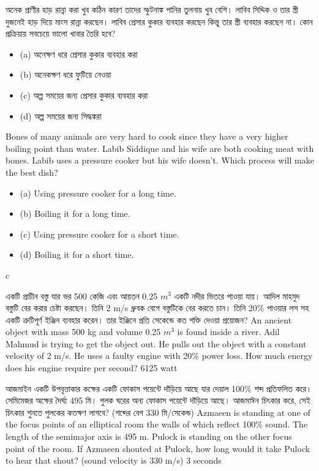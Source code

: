 \documentclass[article, 12pt, a4paper, onesize]{memoir}
\begin{document}
\begin{Problems}
    \problem
    {অনেক প্রাণীর হাড় রান্না করা খুব কঠিন কারণ তাদের স্ফুটনাঙ্ক পানির তুলনায় খুব বেশি। লাবিব সিদ্দিক ও তার স্ত্রী দুজনেই হাড় দিয়ে মাংস রান্না করছেন। লাবিব প্রেসার কুকার ব্যবহার করছেন কিন্তু তার স্ত্রী ব্যবহার করছেন না। কোন প্রক্রিয়ায় সবচেয়ে ভালো খাবার তৈরি হবে?
    \begin{itemize}
        \item[] (a) অনেক্ষণ ধরে প্রেসার কুকার ব্যবহার করা
        \item[] (b) অনেকক্ষণ ধরে ফুটিয়ে নেওয়া
        \item[] (c) অল্প সময়ের জন্য প্রেসার কুকার ব্যবহার করা
        \item[] (d) অল্প সময়ের জন্য সিদ্ধঙ্করা
    \end{itemize}
    }
    {Bones of many animals are very hard to cook since they have a very higher boiling point than water. Labib Siddique and his wife are both cooking meat with bones. Labib uses a pressure cooker but his wife doesn't. Which process will make the best dish?
    \begin{itemize}
        \item[] (a) Using pressure cooker for a long time.
        \item[] (b) Boiling it for a long time.
        \item[] (c) Using pressure cooker for a short time.
        \item[] (d) Boiling it for a short time.
    \end{itemize}
    }
    {}
    {c}

    \problem
    {একটি প্রাচীন বস্তু যার ভর 500 কেজি এবং আয়তন 0.25 $m^3$ একটি নদীর ভিতরে পাওয়া যায়। আদিল মাহমুদ বস্তুটি বের করার চেষ্টা করছেন। তিনি 2 m/s ধ্রুবক বেগে বস্তুটিকে বের করতে চান। তিনি 20\% পাওয়ার লস সহ একটি ত্রুটিপূর্ণ ইঞ্জিন ব্যবহার করেন। তার ইঞ্জিনে প্রতি সেকেন্ডে কত শক্তি দেওয়া প্রয়োজন?}
    {An ancient object with mass 500 kg and volume 0.25 $m^3$ is found inside a river. Adil Mahmud is trying to get the object out. He pulls out the object with a constant velocity of 2 m/s. He uses a faulty engine with 20\% power loss. How much energy does his engine require per second?}
    {}
    {6125 watt}


    \problem
    {আজমাইন একটি উপবৃত্তাকার কক্ষের একটি ফোকাস পয়েন্টে দাঁড়িয়ে আছে যার দেয়াল 100\% শব্দ প্রতিফলিত করে। সেমিমেজর অক্ষের দৈর্ঘ্য 495 মি। পুলক ঘরের অন্য ফোকাস পয়েন্টে দাঁড়িয়ে আছে। আজমাঈন চিৎকার করে, সেই চিৎকার শুনতে পুলকের কতক্ষণ লাগবে? (শব্দের বেগ 330 মি/সেকেন্ড)}
    {Azmaeen is standing at one of the focus points of an elliptical room the walls of which reflect 100\% sound. The length of the semimajor axis is 495 m. Pulock is standing on the other focus point of the room. If Azmaeen shouted at Pulock, how long would it take Pulock to hear that shout? (sound velocity is 330 m/s)}
    {}
    {3 seconds}



\end{Problems}
\end{document}
